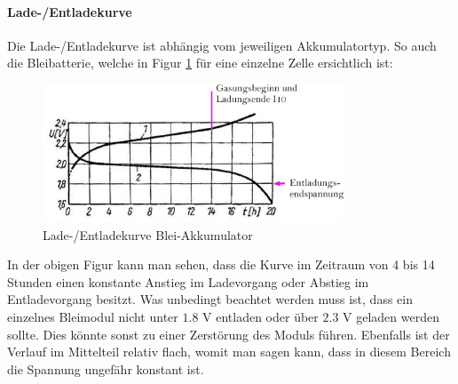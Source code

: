 \newpage

\paragraph{Lade-/Entladekurve}
Die Lade-/Entladekurve ist abhängig vom jeweiligen Akkumulatortyp. So auch die Bleibatterie, welche in Figur \ref{fig:pb_akku_kurve} für eine einzelne Zelle ersichtlich ist:

\begin{figure}[h!]
	\centering
		\includegraphics[width=0.8\textwidth]{images/pb_akku_kurve.jpg}
	\caption{Lade-/Entladekurve Blei-Akkumulator \cite{pb_akku_kurve}}
	\label{fig:pb_akku_kurve}
\end{figure}

In der obigen Figur kann man sehen, dass die Kurve im Zeitraum von 4 bis 14 Stunden einen konstante Anstieg im Ladevorgang oder Abstieg im Entladevorgang besitzt. Was unbedingt beachtet werden muss ist, dass ein einzelnes Bleimodul nicht unter $1.8$ V entladen oder über $2.3$ V geladen werden sollte. Dies könnte sonst zu einer Zerstörung des Moduls führen. Ebenfalls ist der Verlauf im Mittelteil relativ flach, womit man sagen kann, dass in diesem Bereich die Spannung ungefähr konstant ist.

\newpage